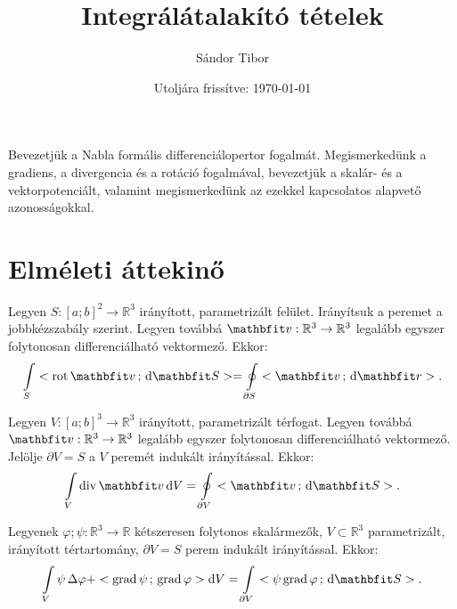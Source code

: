 \documentclass[lang=magyar]{math-handout}
\title{Integrálátalakító tételek}
\date{Utoljára frissítve: \today}
\author{Sándor Tibor}
\begin{document}
\allowdisplaybreaks

\maketitle

\vspace{1em}

\begin{summary}
  Bevezetjük a Nabla formális differenciálopertor fogalmát. Megismerkedünk a
  gradiens, a divergencia és a rotáció fogalmával, bevezetjük a skalár- és a
  vektorpotenciált, valamint megismerkedünk az ezekkel kapcsolatos alapvető
  azonosságokkal.
\end{summary}

\vspace{-1em}

\section{Elméleti áttekinő}

\begin{theorem}
  Legyen $S : [a;b]^2 \rightarrow \mathbb R^3$ irányított,
  parametrizált felület. Irányítsuk a peremet a jobbkézszabály szerint.
  Legyen továbbá $\rvec v : \mathbb R^3 \rightarrow \mathbb R^3$ legalább
  egyszer folytonosan differenciálható vektormező. Ekkor:
  \[
    \int \limits_S \scalar{\rot \rvec v}{\diff \rvec S}
    =
    \oint \limits_{\partial S} \scalar{\rvec v}{\diff \rvec r}
    \text.
  \]
\end{theorem}

\begin{theorem}
  Legyen $V : [a;b]^3 \rightarrow \mathbb R^3$ irányított, parametrizált
  térfogat. Legyen továbbá $\rvec v : \mathbb R^3 \rightarrow \mathbb R^3$
  legalább egyszer folytonosan differenciálható vektormező. Jelölje
  $\partial V = S$ a $V$ peremét indukált irányítással. Ekkor:
  \[
    \int \limits_V \Div \rvec v \, \diff V
    =
    \oint \limits_{\partial V} \scalar{\rvec v}{\diff \rvec S}
    \text.
  \]
\end{theorem}

\begin{theorem}
  Legyenek $\varphi; \psi: \mathbb R^3 \rightarrow \mathbb R$ kétszeresen
  folytonos skalármezők, $V \subset \mathbb R^3$ parametrizált, irányított
  tértartomány, $\partial V = S$ perem indukált irányítással. Ekkor:
  \[
    \int \limits_V
    \psi \, \Delta \varphi +
    \scalar{\grad \psi}{\grad \varphi}
    \diff V
    =
    \int \limits_{\partial V} \scalar{\psi \grad \varphi}{\diff \rvec S}
    \text.
  \]
\end{theorem}
\end{document}
